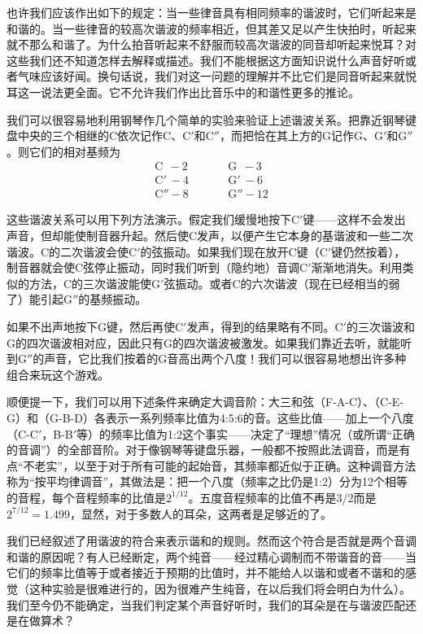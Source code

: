 也许我们应该作出如下的规定：当一些律音具有相同频率的谐波时，它们听起来是和谐的。当一些律音的较高次谐波的频率相近，但其差又足以产生快拍时，听起来就不那么和谐了。为什么拍音听起来不舒服而较高次谐波的同音却听起来悦耳？对这些我们还不知道怎样去解释或描述。我们不能根据这方面知识说什么声音好听或者气味应该好闻。换句话说，我们对这一问题的理解并不比它们是同音听起来就悦耳这一说法更全面。它不允许我们作出比音乐中的和谐性更多的推论。

我们可以很容易地利用钢琴作几个简单的实验来验证上述谐波关系。把靠近钢琴键盘中央的三个相继的C依次记作C、C$'$和C$''$，而把恰在其上方的G记作G、G$'$和G$''$。则它们的相对基频为
\begin{equation*}
    \begin{aligned}
        \text{C}~~-2& ~~~~~~~~~~~~ \text{G}~~-3\\
        \text{C}'~-4& ~~~~~~~~~~~~ \text{G}'~-6 \\
        \text{C}''-8& ~~~~~~~~~~~~ \text{G}''-12
    \end{aligned}
\end{equation*}

这些谐波关系可以用下列方法演示。假定我们缓慢地按下C$'$键——这样不会发出声音，但却能使制音器升起。然后使C发声，以便产生它本身的基谐波和一些二次谐波。C的二次谐波会使C$'$的弦振动。如果我们现在放开C键（C$'$键仍然按着），制音器就会使C弦停止振动，同时我们听到（隐约地）音调C$'$渐渐地消失。利用类似的方法，C的三次谐波能使G$'$弦振动。或者C的六次谐波（现在已经相当的弱了）能引起G$''$的基频振动。

如果不出声地按下G键，然后再使C$'$发声，得到的结果略有不同。C$'$的三次谐波和G的四次谐波相对应，因此只有G的四次谐波被激发。如果我们靠近去听，就能听到G$''$的声音，它比我们按着的G音高出两个八度！我们可以很容易地想出许多种组合来玩这个游戏。

顺便提一下，我们可以用下述条件来确定大调音阶：大三和弦（F-A-C）、（C-E-G）和（G-B-D）各表示一系列频率比值为4:5:6的音。这些比值——加上一个八度（C-C$'$，B-B$'$等）的频率比值为1:2这个事实——决定了“理想”情况（或所谓“正确的音调”）的全部音阶。对于像钢琴等键盘乐器，一般都不按照此法调音，而是有点“不老实”，以至于对于所有可能的起始音，其频率都近似于正确。这种调音方法称为“按平均律调音”，其做法是：把一个八度（频率之比仍是1:2）分为12个相等的音程，每个音程频率的比值是$2^{1/12}$。五度音程频率的比值不再是3/2而是$2^{7/12} =1.499$，显然，对于多数人的耳朵，这两者是足够近的了。

我们已经叙述了用谐波的符合来表示谐和的规则。然而这个符合是否就是两个音调和谐的原因呢？有人已经断定，两个纯音——经过精心调制而不带谐音的音——当它们的频率比值等于或者接近于预期的比值时，并不能给人以谐和或者不谐和的感觉（这种实验是很难进行的，因为很难产生纯音，在以后我们将会明白为什么）。我们至今仍不能确定，当我们判定某个声音好听时，我们的耳朵是在与谐波匹配还是在做算术？

